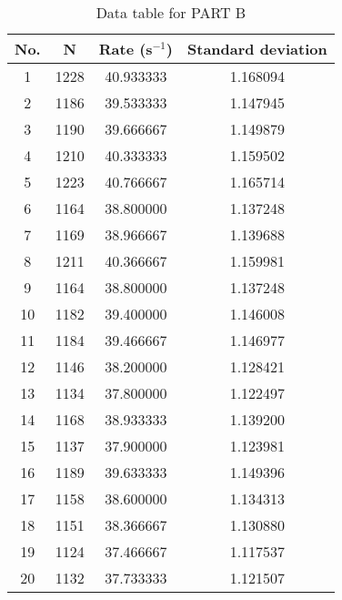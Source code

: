 \documentclass[a4paper,11pt]{article}
\begin{document}
\begin{table}[h!]
\centering
\begin{tabular}{ |c|c|c|c| } 
\hline
No. & N & Rate (s$^{-1}$) & Standard deviation \\
\hline
1 & 1228 & 40.933333 & 1.168094 \\
\hline
2 & 1186 & 39.533333 & 1.147945 \\
\hline
3 & 1190 & 39.666667 & 1.149879 \\
\hline
4 & 1210 & 40.333333 & 1.159502 \\
\hline
5 & 1223 & 40.766667 & 1.165714 \\
\hline
6 & 1164 & 38.800000 & 1.137248 \\
\hline
7 & 1169 & 38.966667 & 1.139688 \\
\hline
8 & 1211 & 40.366667 & 1.159981 \\
\hline
9 & 1164 & 38.800000 & 1.137248 \\
\hline
10 & 1182 & 39.400000 & 1.146008 \\
\hline
11 & 1184 & 39.466667 & 1.146977 \\
\hline
12 & 1146 & 38.200000 & 1.128421 \\
\hline
13 & 1134 & 37.800000 & 1.122497 \\
\hline
14 & 1168 & 38.933333 & 1.139200 \\
\hline
15 & 1137 & 37.900000 & 1.123981 \\
\hline
16 & 1189 & 39.633333 & 1.149396 \\
\hline
17 & 1158 & 38.600000 & 1.134313 \\
\hline
18 & 1151 & 38.366667 & 1.130880 \\
\hline
19 & 1124 & 37.466667 & 1.117537 \\
\hline
20 & 1132 & 37.733333 & 1.121507 \\
\hline
\end{tabular}
\caption{Data table for PART B}
\label{table:1}
\end{table}
\end{document}
